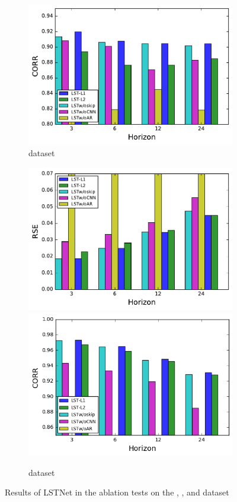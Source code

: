 \begin{figure}[!ht]
\begin{subfigure}{\textwidth}
  \includegraphics[width=.4\linewidth]{fig/corr-ele.pdf}
  \vspace{-0.3cm}
  \caption{\electricity dataset}
\end{subfigure}
\begin{subfigure}{\textwidth}
\centering
\includegraphics[width=.4\linewidth]{fig/rmse-exchange.pdf}
\includegraphics[width=.4\linewidth]{fig/corr-ex.png}
\vspace{-0.3 cm}
\caption{\exchange dataset}
\end{subfigure}
\caption{Results of LSTNet in the ablation tests on the \solar, \traffic, \electricity and \exchange dataset}
\label{fig:ablation}
\end{figure}

